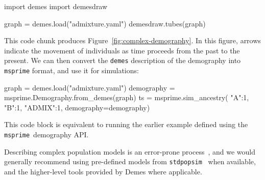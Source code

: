 \documentclass[graybox]{svmult}
\newcommand{\msprime}[0]{\texttt{msprime}}
\begin{document}
\begin{pythoncode}
import demes
import demesdraw

graph = demes.load("admixture.yaml")
demesdraw.tubes(graph)
\end{pythoncode}
This code chunk produces Figure~\ref{fig:complex-demography}. In this figure, arrows indicate
the movement of individuals as time proceeds from the past to the present.
We can then convert the \texttt{demes} description of the demography
into \texttt{msprime} format, and use it for simulations:
\begin{pythoncode}
graph = demes.load("admixture.yaml")
demography = msprime.Demography.from_demes(graph)
ts = msprime.sim_ancestry(
    {"A":1, "B":1, "ADMIX":1},
    demography=demography)
\end{pythoncode}
This code block is 
equivalent to running the earlier example defined using the \msprime\
demography API.

Describing complex population models is an error-prone
process~\citep{ragsdale2020lessons}, and we would generally recommend using
pre-defined models from \texttt{stdpopsim}~\citep{
adrion2020stdpopsim,lauterbur2023expanding,gower2025accessible} when available,
and the higher-level tools provided by Demes where applicable.

\end{document}
